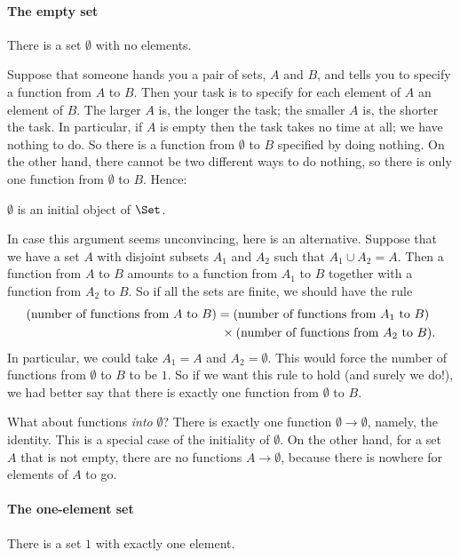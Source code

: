 \paragraph*{The empty set}  
%
%
There is a set $\emptyset$ with no elements.

Suppose that someone hands you a pair of sets, $A$ and $B$, and tells you
to specify a function from $A$ to $B$.  Then your task is to specify for
each element of $A$ an element of $B$.  The larger $A$ is, the longer the
task; the smaller $A$ is, the shorter the task.  In particular, if $A$ is
empty then the task takes no time at all; we have nothing to do.  So there
is a function from $\emptyset$ to $B$ specified by doing nothing.  On the
other hand, there cannot be two different ways to do nothing, so there is
only one function from $\emptyset$ to $B$.  Hence:
% 
\begin{setprop}
$\emptyset$ is an initial object of \hspace{.1em}$\Set$.
\end{setprop}

In case this argument seems unconvincing, here is an alternative.  Suppose
that we have a set $A$ with disjoint subsets $A_1$ and $A_2$ such that $A_1
\cup A_2 = A$.  Then a function from $A$ to $B$ amounts to a function from
$A_1$ to $B$ together with a function from $A_2$ to $B$.  So if all the
sets are finite, we should have the rule
% 
\begin{align*}  
\label{p:num-fns}
%
\index{function!number of functions}
%
(\text{number of functions from $A$ to $B$})	&
=	
(\text{number of functions from $A_1$ to $B$})	\\
& \,\,\times
(\text{number of functions from $A_2$ to $B$}).
\end{align*}
% 
In particular, we could take $A_1 = A$ and $A_2 = \emptyset$.  This would
force the number of functions from $\emptyset$ to $B$ to be $1$.  So if we
want this rule to hold (and surely we do!), we had better say that there is
exactly one function from $\emptyset$ to $B$.

What about functions \emph{into} $\emptyset$?  There is exactly one function
$\emptyset \to \emptyset$, namely, the identity.  This is a special case of
the initiality of $\emptyset$.  On the other hand, for a set $A$ that is not
empty, there are no functions $A \to \emptyset$, because there is nowhere for
elements of $A$ to go.


\paragraph*{The one-element set}  
%
%
There is a set $1$ with exactly one element.

